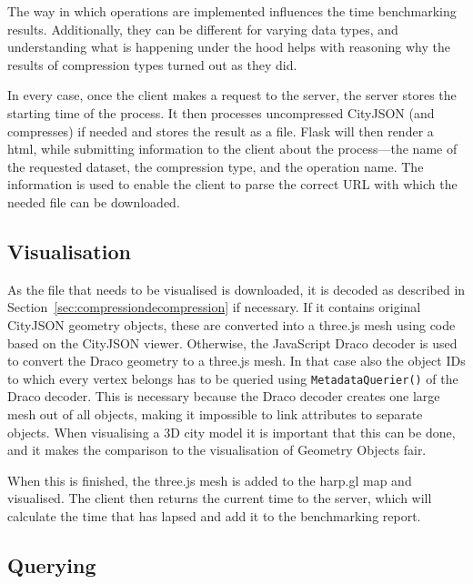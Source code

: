 The way in which operations are implemented influences the time benchmarking results.
Additionally, they can be different for varying data types, and understanding what is happening under the hood helps with reasoning why the results of compression types turned out as they did.

In every case, once the client makes a request to the server, the server stores the starting time of the process.
It then processes uncompressed CityJSON (and compresses) if needed and stores the result as a file.
Flask will then render a \ac{html}, while submitting information to the client about the process---the name of the requested dataset, the compression type, and the operation name.
The information is used to enable the client to parse the correct URL with which the needed file can be downloaded.



\subsection{Visualisation}
As the file that needs to be visualised is downloaded, it is decoded as described in Section~\ref{sec:compressiondecompression} if necessary.
If it contains original CityJSON geometry objects, these are converted into a three.js mesh using code based on the CityJSON viewer.
Otherwise, the JavaScript Draco decoder is used to convert the Draco geometry to a three.js mesh.
In that case also the object IDs to which every vertex belongs has to be queried using \texttt{MetadataQuerier()} of the Draco decoder.
This is necessary because the Draco decoder creates one large mesh out of all objects, making it impossible to link attributes to separate objects.
When visualising a 3D city model it is important that this can be done, and it makes the comparison to the visualisation of Geometry Objects fair.

When this is finished, the three.js mesh is added to the harp.gl map and visualised.
The client then returns the current time to the server, which will calculate the time that has lapsed and add it to the benchmarking report.


\subsection{Querying}
